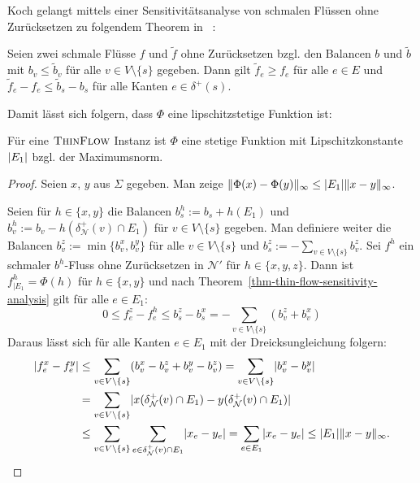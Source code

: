 Koch gelangt mittels einer Sensitivitätsanalyse von schmalen Flüssen ohne Zurück\-setzen zu folgendem Theorem in ~\cite[Theorem 6.53]{Koch2012}:
\begin{theorem}\label{thm-thin-flow-sensitivity-analysis}
	Seien zwei schmale Flüsse $f$ und $\tilde{f}$ ohne Zurücksetzen bzgl. den Balancen $b$ und $\tilde{b}$ mit $b_v \leq \tilde{b}_v$ für alle $v\in V \setminus \{ s \}$ gegeben.
	Dann gilt $\tilde{f}_e \geq f_e$ für alle $e\in E$ und $\tilde{f}_e - f_e \leq \tilde{b}_s - b_s$ für alle Kanten $e\in\delta^+(s)$.
\end{theorem}

Damit lässt sich folgern, dass $\Phi$ eine lipschitzstetige Funktion ist:
\begin{corollary}
	Für eine $\textsc{ThinFlow}$ Instanz ist $\Phi$ eine stetige Funktion mit Lipschitzkonstante $\lvert E_1\rvert$ bzgl. der Maximumsnorm.
\end{corollary}
\begin{proof}
	Seien $x$, $y$ aus $\Sigma$ gegeben.
	Man zeige $ \lVert\Phi(x) - \Phi(y)\rVert_\infty \leq \lvert E_1\rvert \lVert x- y\rVert_\infty $.
	
	Seien für $h\in \{ x,y \}$ die Balancen $b_s^h := b_s + h(E_1)$ und $b_v^h:= b_v - h(\delta^+_\mathcal{N}(v) \cap E_1)$ für $v\in V\setminus\{ s\}$ gegeben.
	Man definiere weiter die Balancen $b_v^z := \min \{ b_v^x, b_v^y \}$ für alle $v\in V\setminus \{ s\}$ und $b_s^z:=-\sum_{v\in V\setminus \{ s\}} b_v^z$.
	Sei $f^h$ ein schmaler $b^h$-Fluss ohne Zurücksetzen in $\mathcal{N}'$ für $h\in \{x, y, z\}$.
	Dann ist $f^h_{\mid E_1} = \Phi(h)$ für $h\in \{x,y \}$ und nach Theorem~\ref{thm-thin-flow-sensitivity-analysis} gilt für alle $e\in E_1$:
	\[
		0\leq f_e^z - f_e^h \leq b_s^z - b_s^x = - \sum_{v\in V\setminus\{ s\}} (b_v^z + b_v^x)
	\]
	Daraus lässt sich für alle Kanten $e\in E_1$ mit der Dreicksungleichung folgern:
	\begin{align*}
		\lvert f_e^x - f_e^y\rvert &\leq \sum_{v\in V\setminus\{s \}} (b_v^x - b_v^z + b_v^y - b_v^z) = \sum_{v\in V\setminus\{s\}} \lvert b_v^x - b_v^y\rvert\\
		& = \sum_{v\in V\setminus\{s\}} \lvert x(\delta^+_\mathcal{N}(v) \cap E_1) - y(\delta^+_\mathcal{N}(v) \cap E_1)\rvert \\
		&\leq \sum_{v\in V\setminus\{ s\}} \sum_{e\in\delta^+_\mathcal{N}(v)\cap E_1} \lvert x_e - y_e\rvert = \sum_{e\in E_1} \lvert x_e - y_e\rvert \leq \lvert E_1\rvert \lVert x-y\rVert_\infty.
	\end{align*}
\end{proof}


